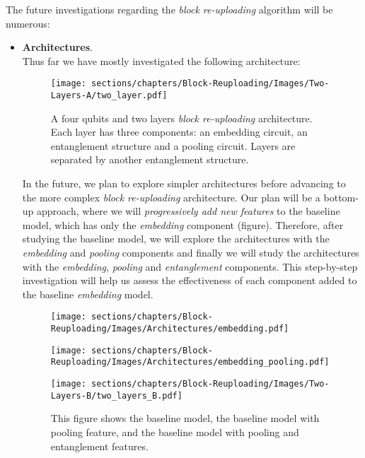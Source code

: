 
The future investigations regarding the \textit{block re-uploading} algorithm will be numerous:

\begin{itemize}
    \item \textbf{Architectures}.\\
    Thus far we have mostly investigated the following architecture:

    \begin{figure}[h]
        \centering
        \texttt{[image: sections/chapters/Block-Reuploading/Images/Two-Layers-A/two\_layer.pdf]}
        \caption{A four qubits and two layers \textit{block re-uploading} architecture. Each layer has three 
        components: an embedding circuit, an entanglement structure and a pooling circuit.
        Layers are separated by another entanglement structure.}
    \end{figure}

    In the future, we plan to explore simpler architectures before advancing to the more 
    complex \textit{block re-uploading} architecture. 
    Our plan will be a bottom-up approach, where we will \textit{progressively add new features} to the baseline model, 
    which has only the \textit{embedding} component (figure).
    Therefore, after studying the baseline model, we will explore the architectures with the 
    \textit{embedding} and \textit{pooling} components and finally we will study the architectures 
    with the \textit{embedding}, \textit{pooling} and \textit{entanglement} components.
    This step-by-step investigation will 
    help us assess the effectiveness of each component added to the baseline \textit{embedding} model.

    \begin{figure}[h]
        \centering
        \begin{minipage}{0.45\textwidth}
            \centering
            \texttt{[image: sections/chapters/Block-Reuploading/Images/Architectures/embedding.pdf]}
        \end{minipage}
        \hfill
        \begin{minipage}{0.45\textwidth}
            \centering
            \texttt{[image: sections/chapters/Block-Reuploading/Images/Architectures/embedding\_pooling.pdf]}
        \end{minipage}
        \vspace{0.5cm} 
        \begin{minipage}{\textwidth}
            \centering
            \texttt{[image: sections/chapters/Block-Reuploading/Images/Two-Layers-B/two\_layers\_B.pdf]}
        \end{minipage}
        \caption{This figure shows the baseline model, the baseline model with pooling feature, and 
        the baseline model with pooling and entanglement features.}
    \end{figure}


\end{itemize}
